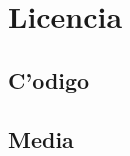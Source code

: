 \section{Licencia}
\label{sub:licencia}

\subsection{C'odigo}
\label{sub:licencia_codigo}

\subsection{Media}
\label{sub:licencia_media}